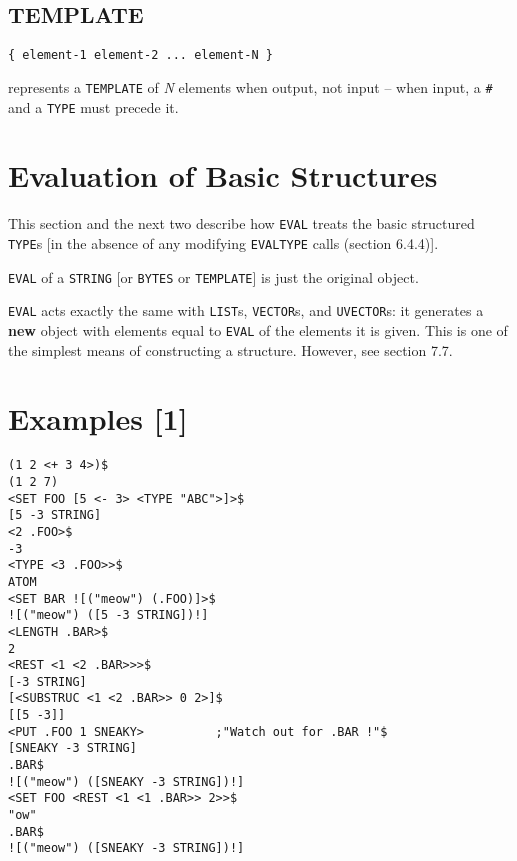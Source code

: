 \documentclass[a4paper]{scrbook}
\begin{document}
\subsection{TEMPLATE}\label{template}

\begin{verbatim}
{ element-1 element-2 ... element-N }
\end{verbatim}

  represents a
\texttt{TEMPLATE} of \emph{N} elements when output, not input -- when input, a \texttt{\#}
and a \texttt{TYPE} must precede it.

\section{Evaluation of Basic Structures}\label{evaluation-of-basic-structures}

This section and the next two describe how \texttt{EVAL} treats the basic structured \texttt{TYPE}s {[}in the absence of
any modifying \texttt{EVALTYPE} calls (section 6.4.4){]}.

\texttt{EVAL} of a \texttt{STRING} {[}or \texttt{BYTES} or \texttt{TEMPLATE}{]} is just the original object.

\texttt{EVAL} acts exactly the same with \texttt{LIST}s, \texttt{VECTOR}s, and \texttt{UVECTOR}s: it generates a
\textbf{new} object with elements equal to \texttt{EVAL} of the elements it is given. This is one of the simplest means of
constructing a structure. However, see section 7.7.

\section{Examples {[}1{]}}\label{examples-1}

\begin{verbatim}
(1 2 <+ 3 4>)$
(1 2 7)
<SET FOO [5 <- 3> <TYPE "ABC">]>$
[5 -3 STRING]
<2 .FOO>$
-3
<TYPE <3 .FOO>>$
ATOM
<SET BAR ![("meow") (.FOO)]>$
![("meow") ([5 -3 STRING])!]
<LENGTH .BAR>$
2
<REST <1 <2 .BAR>>>$
[-3 STRING]
[<SUBSTRUC <1 <2 .BAR>> 0 2>]$
[[5 -3]]
<PUT .FOO 1 SNEAKY>          ;"Watch out for .BAR !"$
[SNEAKY -3 STRING]
.BAR$
![("meow") ([SNEAKY -3 STRING])!]
<SET FOO <REST <1 <1 .BAR>> 2>>$
"ow"
.BAR$
![("meow") ([SNEAKY -3 STRING])!]
\end{verbatim}

\end{document}
